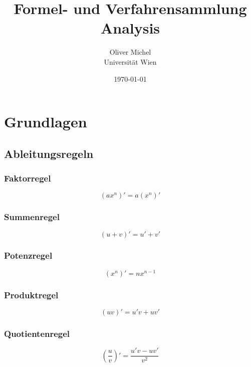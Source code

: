 \documentclass[a4paper,11pt]{article}
\title{Formel- und Verfahrensammlung Analysis}
\author{Oliver Michel\\Universität Wien}
\date{\today}
\begin{document}
		
	\maketitle
	\tableofcontents

	\pagebreak

	\section{Grundlagen} %
	\label{sec:grundlagen}
	
	\subsection{Ableitungsregeln} %
	\label{sub:ableitungsregeln}
	
	\subsubsection{Faktorregel}
	\label{ssub:faktorregel}
	\begin{equation}
		(ax^n)' = a(x^n)' 
	\end{equation}	
	
	\subsubsection{Summenregel}
	\label{ssub:summenregel}
	\begin{equation}
		(u+v)' = u' + v' 
	\end{equation}	
	
	\subsubsection{Potenzregel}
	\label{ssub:potenzregel}
	\begin{equation}
		(x^n)' = nx^{n-1} 
	\end{equation}

	\subsubsection{Produktregel}
	\label{ssub:produktregel}
	\begin{equation}
		(uv)' = u'v + uv'
	\end{equation}	

	\subsubsection{Quotientenregel}
	\label{ssub:quotientenregel}
	\begin{equation}
		\left(\frac{u}{v}\right)' = \frac{u'v - uv'}{v^2}
	\end{equation}
	
\end{document}
